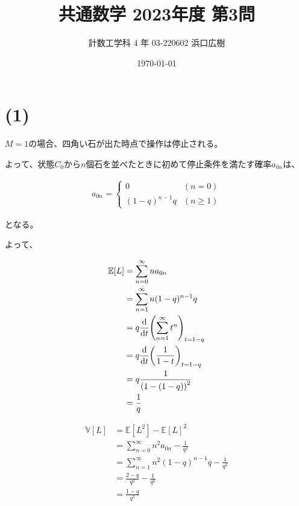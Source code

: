 \documentclass[a4paper, 10pt, dvipdfmx]{jlreq}
\begin{document}
\title{共通数学 2023年度 第3問}
\author{計数工学科 4 年 03-220602 浜口広樹}
\date{\today}
\maketitle

\section*{(1)}

$M=1$の場合、四角い石が出た時点で操作は停止される。

よって、状態$C_0$から$n$個石を並べたときに初めて停止条件を満たす確率$a_{0n}$は、

\begin{align*}
    a_{0n} =
    \begin{cases}
        0            & (n = 0   ) \\
        (1-q)^{n-1}q & (n \geq 1)
    \end{cases}
\end{align*}

となる。

よって、

\begin{align*}
    \mathbb{E}[L] & = \sum_{n=0}^{\infty} na_{0n}                   \\
                  & = \sum_{n=1}^{\infty} n(1-q)^{n-1}q             \\
                  & = q\dv{t}\qty(\sum_{n=1}^{\infty}{t^n})_{t=1-q} \\
                  & = q\dv{t}\qty(\frac{1}{1-t})_{t=1-q}            \\
                  & = q\frac{1}{\qty(1-(1-q))^2}                    \\
                  & = \frac{1}{q}                                   \\
\end{align*}


\begin{align*}
    \mathbb{V}[L] & = \mathbb{E}[L^2] - \mathbb{E}[L]^2                   \\
                  & = \sum_{n=0}^{\infty} n^2a_{0n} - \frac{1}{q^2}       \\
                  & = \sum_{n=1}^{\infty} n^2(1-q)^{n-1}q - \frac{1}{q^2} \\
                  & = \frac{2-q}{q^2}-\frac{1}{q^2}                       \\
                  & = \frac{1-q}{q^2}                                     \\
\end{align*}
\end{document}
